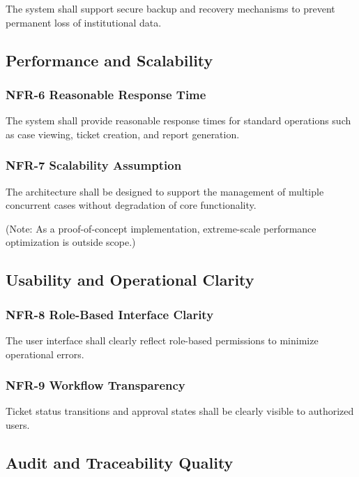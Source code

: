\documentclass[12pt,a4paper]{report}
\begin{document}
The system shall support secure backup and recovery mechanisms to prevent permanent loss of institutional data.

\subsection{ Performance and Scalability}

\subsubsection{NFR-6 Reasonable Response Time}

The system shall provide reasonable response times for standard operations such as case viewing, ticket creation, and report generation.

\subsubsection{NFR-7 Scalability Assumption}

The architecture shall be designed to support the management of multiple concurrent cases without degradation of core functionality.

(Note: As a proof-of-concept implementation, extreme-scale performance optimization is outside scope.)

\subsection{Usability and Operational Clarity}

\subsubsection{NFR-8 Role-Based Interface Clarity}

The user interface shall clearly reflect role-based permissions to minimize operational errors.

\subsubsection{NFR-9 Workflow Transparency}

Ticket status transitions and approval states shall be clearly visible to authorized users.


\subsection{Audit and Traceability Quality}
\end{document}
